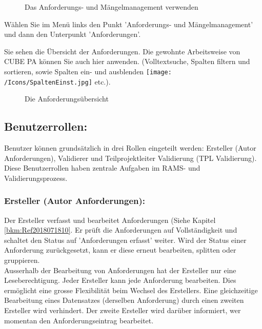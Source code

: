\begin{figure}
\begin{center}
  \end{center}
  \vspace{-20pt}
  \caption{Das Anforderungs- und Mängelmanagement verwenden}
  \vspace{-10pt}
\end{figure}

Wählen Sie im Menü links den Punkt 'Anforderungs- und Mängelmanagement' und dann den Unterpunkt 'Anforderungen'.

\vspace{9.5cm}

Sie sehen die Übersicht der Anforderungen. Die gewohnte Arbeitsweise von CUBE PA können Sie auch hier anwenden. (Volltextsuche, Spalten filtern und sortieren, sowie Spalten ein- und ausblenden \texttt{[image: /Icons/SpaltenEinst.jpg]} etc.).

\begin{figure}[H]
\caption{Die Anforderungsübersicht}
\end{figure}

\subsection{Benutzerrollen:} 
Benutzer können grundsätzlich in drei Rollen eingeteilt werden: Ersteller (Autor Anforderungen), Validierer und Teilprojektleiter Validierung (TPL Validierung). Diese Benutzerrollen haben zentrale Aufgaben im RAMS- und Validierungsprozess.

\subsubsection{Ersteller (Autor Anforderungen):} 
Der Ersteller verfasst und bearbeitet Anforderungen (Siehe Kapitel \ref{bkm:Ref2018071810}. Er prüft die Anforderungen auf Vollständigkeit und schaltet den Status auf 'Anforderungen erfasst' weiter. Wird der Status einer Anforderung zurückgesetzt, kann er diese erneut bearbeiten, splitten oder gruppieren. \\
Ausserhalb der Bearbeitung von Anforderungen hat der Ersteller nur eine Leseberechtigung. Jeder Ersteller kann jede Anforderung bearbeiten. Dies ermöglicht eine grosse Flexibilität beim Wechsel des Erstellers. Eine gleichzeitige Bearbeitung eines Datensatzes (derselben Anforderung) durch einen zweiten Ersteller wird verhindert. Der zweite Ersteller wird darüber informiert, wer momentan den Anforderungseintrag bearbeitet. 

